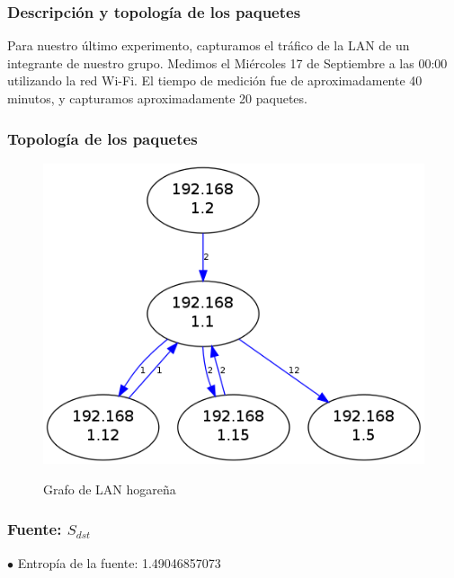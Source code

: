 \documentclass[10pt, a4paper]{article}
\begin{document}
\subsubsection{Descripción y topología de los paquetes}

Para nuestro último experimento, capturamos el tráfico de la LAN de un integrante de nuestro grupo. Medimos el Miércoles 17 de Septiembre a las 00:00 utilizando la red Wi-Fi. El tiempo de medición fue de aproximadamente 40 minutos, y capturamos aproximadamente 20 paquetes.

\subsubsection{Topología de los paquetes}

\begin{figure}[H]
  \begin{center}
    \includegraphics[width=\linewidth/2]{../imgs/pruebaFede-ips_red.png}
    \label{fig:FedeGrafo}
    \caption{Grafo de LAN hogareña}
  \end{center}
\end{figure}

\subsubsection{Fuente: $S_{dst}$}

$\bullet$ Entropía de la fuente: 1.49046857073
\end{document}
